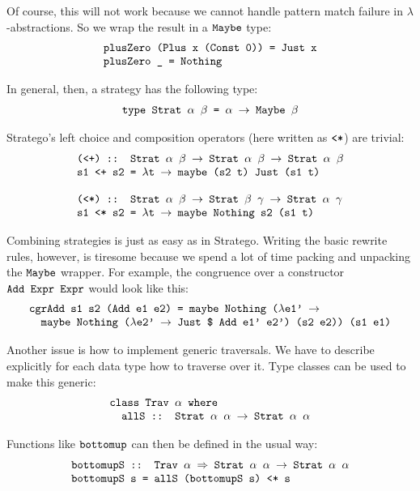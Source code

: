 \documentclass[fleqn]{article}
\newcommand{\ve}[1]{\ensuremath{\text{\tt #1}}}
\newcommand{\ra}{\ensuremath{\rightarrow} }
\newcommand{\Ra}{\ensuremath{\Rightarrow} }
\begin{document}
Of course, this will not work because we cannot handle pattern match
failure in $\lambda$-abstractions.  So we wrap the result in a
\ve{Maybe} type:
\[
\begin{array}{l}
\ve{plusZero (Plus x (Const 0)) = Just x} \\
\ve{plusZero \_ = Nothing} \\
\end{array}
\]

In general, then, a strategy has the following type: 
\[
\begin{array}{l}
\ve{type Strat $\alpha$ $\beta$ = $\alpha$ \ra Maybe $\beta$}
\end{array}
\]

Stratego's left choice and composition operators (here written as
\ve{<*}) are trivial:
\[
\begin{array}{l}
\ve{(<+) :: Strat $\alpha$ $\beta$ \ra Strat $\alpha$ $\beta$ \ra Strat $\alpha$ $\beta$} \\
\ve{s1 <+ s2 = $\lambda$t \ra maybe (s2 t) Just (s1 t)} \\
\\
\ve{(<*) :: Strat $\alpha$ $\beta$ \ra Strat $\beta$ $\gamma$ \ra Strat $\alpha$ $\gamma$} \\
\ve{s1 <* s2 = $\lambda$t \ra maybe Nothing s2 (s1 t)}
\end{array}
\]

Combining strategies is just as easy as in Stratego.  Writing the
basic rewrite rules, however, is tiresome because we spend a lot of
time packing and unpacking the \ve{Maybe} wrapper.  For example, the
congruence over a constructor \ve{Add Expr Expr} would look like this:
\[
\begin{array}{l}
\ve{cgrAdd s1 s2 (Add e1 e2) = maybe Nothing ($\lambda$e1' \ra} \\
\ve{\quad maybe Nothing ($\lambda$e2' \ra Just \$ Add e1' e2') (s2 e2)) (s1 e1)}
\end{array}
\]

Another issue is how to implement generic traversals.  We have to
describe explicitly for each data type how to traverse over it.  Type
classes can be used to make this generic:
\[
\begin{array}{l}
\ve{class Trav $\alpha$ where} \\
\ve{\quad allS :: Strat $\alpha$ $\alpha$ \ra Strat $\alpha$ $\alpha$}
\end{array}
\]

Functions like \ve{bottomup} can then be defined in the usual way:
\[
\begin{array}{l}
\ve{bottomupS :: Trav $\alpha$ \Ra Strat $\alpha$ $\alpha$ \ra Strat $\alpha$ $\alpha$} \\
\ve{bottomupS s = allS (bottomupS s) <* s}
\end{array}
\]
\end{document}

